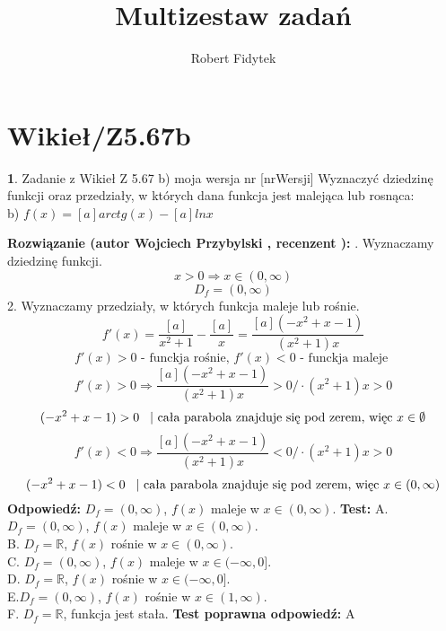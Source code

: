 \documentclass[12pt, a4paper]{article}
\title{Multizestaw zadań}
\author{Robert Fidytek}
\date{}
\theoremstyle{definition} %
\newtheorem{zad}{}
\newcommand{\kategoria}[1]{\section{#1}} %
\newcommand{\zadStart}[1]{\begin{zad}#1\newline} %
\newcommand{\zadStop}{\end{zad}}   %
\newcommand{\rozwStart}[2]{\noindent \textbf{Rozwiązanie (autor #1 , recenzent #2): }\newline} %
\newcommand{\rozwStop}{\newline}                                            %
\newcommand{\odpStart}{\noindent \textbf{Odpowiedź:}\newline}    %
\newcommand{\odpStop}{\newline}                                             %
\newcommand{\testStart}{\noindent \textbf{Test:}\newline} %
\newcommand{\testStop}{\newline} %
\newcommand{\kluczStart}{\noindent \textbf{Test poprawna odpowiedź:}\newline} %
\newcommand{\kluczStop}{\newline} %
\begin{document}
\maketitle


\kategoria{Wikieł/Z5.67b}
\zadStart{Zadanie z Wikieł Z 5.67 b) moja wersja nr [nrWersji]}
Wyznaczyć dziedzinę funkcji oraz przedziały, w których dana funkcja jest malejąca lub rosnąca:\\
b) $f(x)=[a]arctg(x)-[a]lnx$
\zadStop
\rozwStart{Wojciech Przybylski}{}
1. Wyznaczamy dziedzinę funkcji.
$$x>0 \Rightarrow x\in(0,\infty)$$
$$D_{f}=(0,\infty)$$
2. Wyznaczamy przedziały, w których funkcja maleje lub rośnie. 
$$f'(x)=\frac{[a]}{x^{2}+1}-\frac{[a]}{x}=\frac{[a](-x^{2}+x-1)}{(x^{2}+1)x}$$
$$f'(x)>0 \mbox{ - funckja rośnie, } f'(x)<0 \mbox{ - funckja maleje }$$
$$f'(x)>0\Rightarrow \frac{[a](-x^{2}+x-1)}{(x^{2}+1)x}>0 /\cdot(x^{2}+1)x>0$$
$$(-x^{2}+x-1)>0 \hspace{3mm} |\mbox{ cała parabola znajduje się pod zerem, więc }x\in\emptyset$$
$$f'(x)<0\Rightarrow \frac{[a](-x^{2}+x-1)}{(x^{2}+1)x}<0 /\cdot(x^{2}+1)x>0$$
$$(-x^{2}+x-1)<0 \hspace{3mm} |\mbox{ cała parabola znajduje się pod zerem, więc }x\in(0,\infty)$$
\rozwStop
\odpStart
$D_{f}=(0,\infty)$, $f(x)$ maleje w $x\in(0,\infty)$.
\odpStop
\testStart
A. $D_{f}=(0,\infty)$, $f(x)$ maleje w $x\in(0,\infty)$.\\
B. $D_{f}=\mathbb{R}$, $f(x)$ rośnie w $x\in(0,\infty)$.\\
C. $D_{f}=(0,\infty)$, $f(x)$ maleje w $x\in(-\infty,0]$.\\
D. $D_{f}=\mathbb{R}$, $f(x)$ rośnie w $x\in(-\infty,0]$.\\
E.$D_{f}=(0,\infty)$, $f(x)$ rośnie w $x\in(1,\infty)$.\\
F. $D_{f}=\mathbb{R}$, funkcja jest stała.
\testStop
\kluczStart
A
\kluczStop
\end{document}
